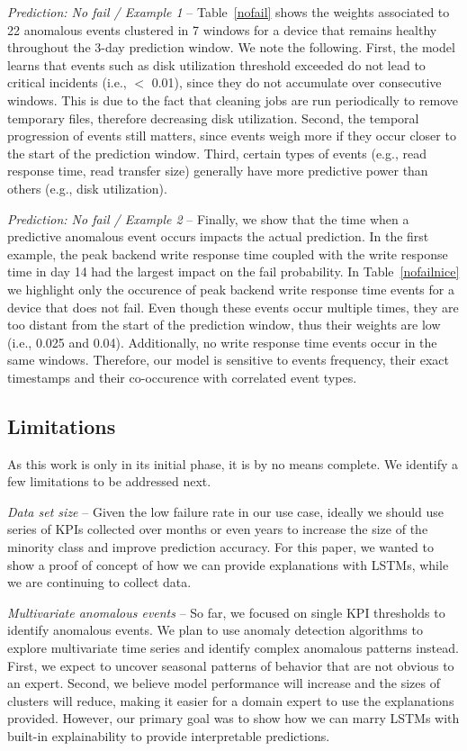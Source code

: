 \documentclass[letterpaper]{article} %
\begin{document}
\textit{Prediction: No fail / Example 1} -- Table~\ref{nofail} shows the weights associated to 22 anomalous events clustered in 7 windows for a device that remains healthy throughout the 3-day prediction window. We note the following. First, the model learns that events such as disk utilization threshold exceeded do not lead to critical incidents (i.e., $<$ 0.01), since they do not accumulate over consecutive windows. This is due to the fact that cleaning jobs are run periodically to remove temporary files, therefore decreasing disk utilization. Second, the temporal progression of events still matters, since events weigh more if they occur closer to the start of the prediction window. Third, certain types of events (e.g., read response time, read transfer size) generally have more predictive power than others (e.g., disk utilization).

\textit{Prediction: No fail / Example 2} -- Finally, we show that the time when a predictive anomalous event occurs impacts the actual prediction. In the first example, the peak backend write response time coupled with the write response time in day 14 had the largest impact on the fail probability. In Table~\ref{nofailnice} we highlight only the occurence of peak backend write response time events for a device that does not fail. Even though these events occur multiple times, they are too distant from the start of the prediction window, thus their weights are low (i.e., 0.025 and 0.04). Additionally, no write response time events occur in the same windows. Therefore, our model is sensitive to events frequency, their exact timestamps and their co-occurence with correlated event types.




\subsection{Limitations}
As this work is only in its initial phase, it is by no means complete. We identify a few limitations to be addressed next.

\textit{Data set size} -- Given the low failure rate in our use case, ideally we should use series of KPIs collected over months or even years to increase the size of the minority class and improve prediction accuracy. For this paper, we wanted to show a proof of concept of how we can provide explanations with LSTMs, while we are continuing to collect data.

\textit{Multivariate anomalous events} -- So far, we focused on single KPI thresholds to identify anomalous events. We plan to use anomaly detection algorithms to explore multivariate time series and identify complex anomalous patterns instead. First, we expect to uncover seasonal patterns of behavior that are not obvious to an expert. Second, we believe model performance will increase and the sizes of clusters will reduce, making it easier for a domain expert to use the explanations provided. However, our primary goal was to show how we can marry LSTMs with built-in explainability to provide interpretable predictions.
\end{document}
